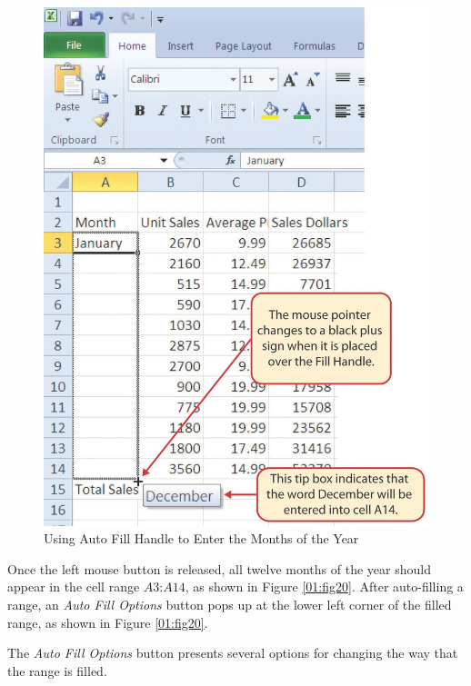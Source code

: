 \begin{figure}[H]
	\centering
	\includegraphics[width=\maxwidth{.95\linewidth}]{gfx/ch01_fig19}
	\caption{Using Auto Fill Handle to Enter the Months of the Year}
	\label{01:fig19}
\end{figure}

Once the left mouse button is released, all twelve months of the year should appear in the cell range $ A3 $:$ A14 $, as shown in Figure \ref{01:fig20}. After auto-filling a range, an \textit{Auto Fill Options} button pops up at the lower left corner of the filled range, as shown in Figure \ref{01:fig20}. 

 The \textit{Auto Fill Options} button presents several options for changing the way that the range is filled.

